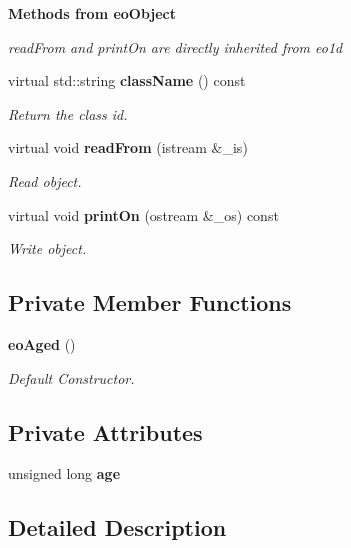 \begin{Indent}{\bf Methods from eo\-Object}\par
{\em read\-From and print\-On are directly inherited from eo1d }\begin{CompactItemize}
\item 
virtual std::string {\bf class\-Name} () const 
\begin{CompactList}\small\item\em Return the class id. \item\end{CompactList}\item 
virtual void {\bf read\-From} (istream \&\_\-is)
\begin{CompactList}\small\item\em Read object. \item\end{CompactList}\item 
virtual void {\bf print\-On} (ostream \&\_\-os) const 
\begin{CompactList}\small\item\em Write object. \item\end{CompactList}\end{CompactItemize}
\end{Indent}
\subsection*{Private Member Functions}
\begin{CompactItemize}
\item 
{\bf eo\-Aged} ()
\begin{CompactList}\small\item\em Default Constructor. \item\end{CompactList}\end{CompactItemize}
\subsection*{Private Attributes}
\begin{CompactItemize}
\item 
unsigned long {\bf age}\label{classeo_aged_r0}

\end{CompactItemize}


\subsection{Detailed Description}
